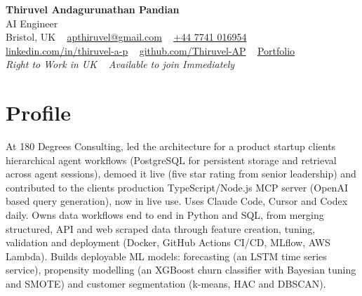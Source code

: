 \documentclass[a4paper,11pt]{article}
\begin{document}
\begin{center}
  {\fontsize{22}{26}\selectfont\bfseries\color{navy} Thiruvel Andagurunathan Pandian}\\[4pt]
  {\fontsize{12}{14}\selectfont\color{navy} AI Engineer}\\[4pt]
  {\small
  Bristol, UK\nobreak\ \,\textperiodcentered\, \href{mailto:apthiruvel@gmail.com}{apthiruvel@gmail.com}\nobreak\ \,\textperiodcentered\, \href{tel:+447741016954}{+44 7741 016954}\nobreak\ \,\textperiodcentered\, \href{https://www.linkedin.com/in/thiruvel-a-p/}{linkedin.com/in/thiruvel-a-p}\nobreak\ \,\textperiodcentered\, \href{https://github.com/Thiruvel-AP}{github.com/Thiruvel-AP}\nobreak\ \,\textperiodcentered\, \href{https://thiruvel-ap.github.io/PersonalPortfolio/}{Portfolio}}\\[3pt]
  {\small\itshape\color{muted} Right to Work in UK\nobreak\ \,\textperiodcentered\, Available to join Immediately}

\end{center}

\section{Profile}
At 180 Degrees Consulting, led the architecture for a product startup client\textquotesingle{}s hierarchical agent workflows (PostgreSQL for persistent storage and retrieval across agent sessions), demoed it live (five star rating from senior leadership) and contributed to the client\textquotesingle{}s production TypeScript/Node.js MCP server (OpenAI based query generation), now in live use. Uses Claude Code, Cursor and Codex daily. Owns data workflows end to end in Python and SQL, from merging structured, API and web scraped data through feature creation, tuning, validation and deployment (Docker, GitHub Actions CI/CD, MLflow, AWS Lambda). Builds deployable ML models: forecasting (an LSTM time series service), propensity modelling (an XGBoost churn classifier with Bayesian tuning and SMOTE) and customer segmentation (k-means, HAC and DBSCAN).
\end{document}
